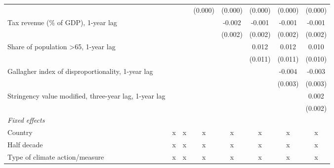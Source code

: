 \begin{tabular}{lccccccc}
                                                                       &               &               & (0.000)       & (0.000)       & (0.000)       & (0.000)       & (0.000)\\   
   Tax revenue (\% of GDP), 1-year lag                                 &               &               &               & -0.002        & -0.001        & -0.001        & -0.001\\   
                                                                       &               &               &               & (0.002)       & (0.002)       & (0.002)       & (0.002)\\   
   Share of population >65, 1-year lag                                 &               &               &               &               & 0.012         & 0.012         & 0.010\\   
                                                                       &               &               &               &               & (0.011)       & (0.011)       & (0.010)\\   
   Gallagher index of disproportionality, 1-year lag                   &               &               &               &               &               & -0.004        & -0.003\\   
                                                                       &               &               &               &               &               & (0.003)       & (0.003)\\   
   Stringency value modified, three-year lag, 1-year lag               &               &               &               &               &               &               & 0.002\\   
                                                                       &               &               &               &               &               &               & (0.002)\\   
   \emph{Fixed effects}\\
   Country                                                             & x             & x             & x             & x             & x             & x             & x\\  
   Half decade                                                         & x             & x             & x             & x             & x             & x             & x\\  
   Type of climate action/measure                                      & x             & x             & x             & x             & x             & x             & x\\  

\end{tabular}
